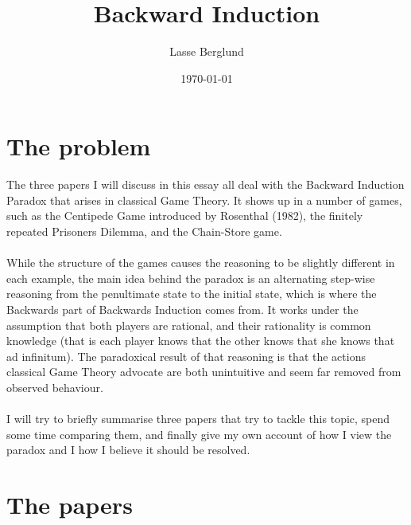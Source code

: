 \documentclass{article}
\title{Backward Induction}
\author{Lasse Berglund}
\date{\today}
\begin{document}
\maketitle
\section{The problem}
The three papers I will discuss in this essay all deal with the Backward Induction Paradox that arises in classical Game Theory. It shows up in a number of games, such as the Centipede Game introduced by Rosenthal (1982), the finitely repeated Prisoners Dilemma, and the Chain-Store game.
\\
\\
While the structure of the games causes the reasoning to be slightly different in each example, the main idea behind the paradox is an alternating step-wise reasoning from the penultimate state to the initial state, which is where the Backwards part of Backwards Induction comes from. It works under the assumption that both players are rational, and their rationality is common knowledge (that is each player knows that the other knows that she knows that ad infinitum). The paradoxical result of that reasoning is that the actions classical Game Theory advocate are both unintuitive and seem far removed from observed behaviour.
\\
\\
I will try to briefly summarise three papers that try to tackle this topic, spend some time comparing them, and finally give my own account of how I view the paradox and I how I believe it should be resolved. 





















\section{The papers}
\end{document}
